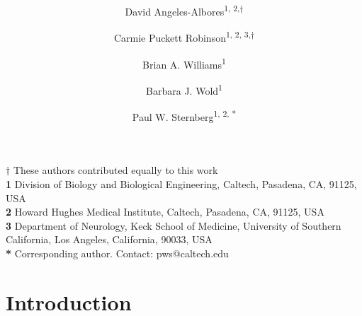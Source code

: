 \documentclass[10pt, onecolumn]{article}
\title{
  \Large
  \textbf{\titleone}
}
\author{David Angeles-Albores\textsuperscript{1, 2,$\dagger{}$}
\and{}
Carmie Puckett Robinson\textsuperscript{1, 2, 3,$\dagger{}$}
\and{}
Brian A. Williams\textsuperscript{1}
\and{}
Barbara J. Wold\textsuperscript{1}
\and{}
Paul W. Sternberg\textsuperscript{1, 2, *}
}
\begin{document}
\linenumbers{}

\maketitle
\textbf{$\dagger$} These authors contributed equally to this work\\
\textbf{1} Division of Biology and Biological Engineering, Caltech,
Pasadena, CA, 91125, USA\\
\textbf{2} Howard Hughes Medical Institute, Caltech, Pasadena, CA, 91125, USA\\
\textbf{3} Department of Neurology, Keck School of Medicine, University of
Southern California, Los Angeles, California, 90033, USA\\
\textbf{*} Corresponding author. Contact: pws@caltech.edu


\section*{Introduction}






\end{document}
